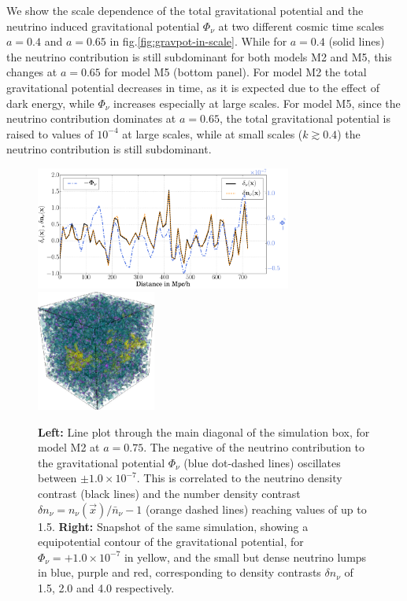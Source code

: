 We show the scale dependence of the total gravitational potential
and the neutrino induced gravitational potential $\Phi_{\nu}$ at
two different cosmic time scales $a=0.4$ and $a=0.65$ in fig.\ref{fig:gravpot-in-scale}.
While for $a=0.4$ (solid lines) the neutrino contribution is still
subdominant for both models M2 and M5, this changes at $a=0.65$ for
model M5 (bottom panel). For model M2 the total gravitational potential
decreases in time, as it is expected due to the effect of dark energy,
while $\Phi_{\nu}$ increases especially at large scales. For model
M5, since the neutrino contribution dominates at $a=0.65$, the total
gravitational potential is raised to values of $10^{-4}$ at large
scales, while at small scales ($k\gtrsim0.4$) the neutrino contribution
is still subdominant.

\begin{figure}
\centering{}
\includegraphics[width=0.75\textwidth]{Chapters/gnq/figures/Lineout-Diagonal--at-a0p75-deltanu_numbnu_Phinu}\includegraphics[width=0.35\textwidth]{Chapters/gnq/figures/model2-psinu-numbnu-a0p75-cropped}\protect
\caption[Line plot of the gravitational potential and snapshot for model M2 in GNQ.]{\label{fig:lineout-gravpotnu} 
\textbf{Left: }Line plot through the
main diagonal of the simulation box, for model M2 at $a=0.75$. The
negative of the neutrino contribution to the gravitational potential
$\Phi_{\nu}$ (blue dot-dashed lines) oscillates between $\pm1.0\times10^{-7}$.
This is correlated to the neutrino density contrast (black lines)
and the number density contrast $\delta n_{\nu}=n_{\nu}(\vec{x})/\bar{n}_{\nu}-1$
(orange dashed lines) reaching values of up to 1.5. \textbf{Right:
}Snapshot of the same simulation, showing a equipotential contour
of the gravitational potential, for $\Phi_{\nu}=+1.0\times10^{-7}$
in yellow, and the small but dense neutrino lumps in blue, purple
and red, corresponding to density contrasts $\delta n_{\nu}$ of 1.5,
2.0 and 4.0 respectively.}
\end{figure}


